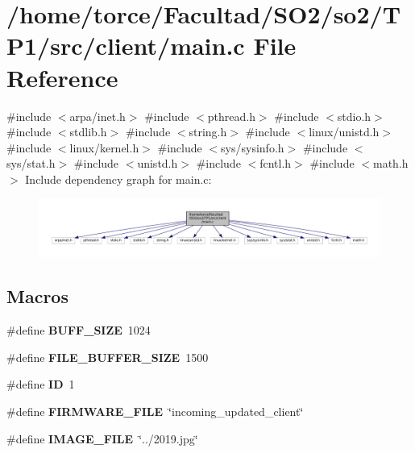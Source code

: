 \section{/home/torce/\+Facultad/\+S\+O2/so2/\+T\+P1/src/client/main.c File Reference}
\label{client_2main_8c}
{\ttfamily \#include $<$arpa/inet.\+h$>$}\newline
{\ttfamily \#include $<$pthread.\+h$>$}\newline
{\ttfamily \#include $<$stdio.\+h$>$}\newline
{\ttfamily \#include $<$stdlib.\+h$>$}\newline
{\ttfamily \#include $<$string.\+h$>$}\newline
{\ttfamily \#include $<$linux/unistd.\+h$>$}\newline
{\ttfamily \#include $<$linux/kernel.\+h$>$}\newline
{\ttfamily \#include $<$sys/sysinfo.\+h$>$}\newline
{\ttfamily \#include $<$sys/stat.\+h$>$}\newline
{\ttfamily \#include $<$unistd.\+h$>$}\newline
{\ttfamily \#include $<$fcntl.\+h$>$}\newline
{\ttfamily \#include $<$math.\+h$>$}\newline
Include dependency graph for main.\+c\+:
\nopagebreak
\begin{figure}[H]
\begin{center}
\leavevmode
\includegraphics[width=350pt]{client_2main_8c__incl}
\end{center}
\end{figure}
\subsection*{Macros}
\begin{DoxyCompactItemize}
\item 
\#define \textbf{ B\+U\+F\+F\+\_\+\+S\+I\+ZE}~1024
\item 
\#define \textbf{ F\+I\+L\+E\+\_\+\+B\+U\+F\+F\+E\+R\+\_\+\+S\+I\+ZE}~1500
\item 
\#define \textbf{ ID}~1
\item 
\#define \textbf{ F\+I\+R\+M\+W\+A\+R\+E\+\_\+\+F\+I\+LE}~\char`\"{}incoming\+\_\+updated\+\_\+client\char`\"{}
\item 
\#define \textbf{ I\+M\+A\+G\+E\+\_\+\+F\+I\+LE}~\char`\"{}../2019.jpg\char`\"{}
\end{DoxyCompactItemize}

